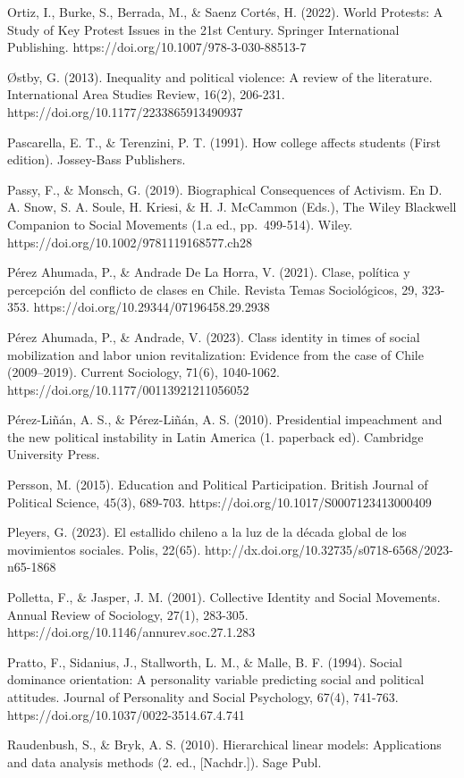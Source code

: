 \documentclass[
  13pt,
]{article}
\begin{document}
Ortiz, I., Burke, S., Berrada, M., \& Saenz Cortés, H. (2022). World
Protests: A Study of Key Protest Issues in the 21st Century. Springer
International Publishing. https://doi.org/10.1007/978-3-030-88513-7

Østby, G. (2013). Inequality and political violence: A review of the
literature. International Area Studies Review, 16(2), 206-231.
https://doi.org/10.1177/2233865913490937

Pascarella, E. T., \& Terenzini, P. T. (1991). How college affects
students (First edition). Jossey-Bass Publishers.

Passy, F., \& Monsch, G. (2019). Biographical Consequences of Activism.
En D. A. Snow, S. A. Soule, H. Kriesi, \& H. J. McCammon (Eds.), The
Wiley Blackwell Companion to Social Movements (1.a ed., pp.~499-514).
Wiley. https://doi.org/10.1002/9781119168577.ch28

Pérez Ahumada, P., \& Andrade De La Horra, V. (2021). Clase, política y
percepción del conflicto de clases en Chile. Revista Temas Sociológicos,
29, 323-353. https://doi.org/10.29344/07196458.29.2938

Pérez Ahumada, P., \& Andrade, V. (2023). Class identity in times of
social mobilization and labor union revitalization: Evidence from the
case of Chile (2009--2019). Current Sociology, 71(6), 1040-1062.
https://doi.org/10.1177/00113921211056052

Pérez-Liñán, A. S., \& Pérez-Liñán, A. S. (2010). Presidential
impeachment and the new political instability in Latin America (1.
paperback ed). Cambridge University Press.

Persson, M. (2015). Education and Political Participation. British
Journal of Political Science, 45(3), 689-703.
https://doi.org/10.1017/S0007123413000409

Pleyers, G. (2023). El estallido chileno a la luz de la década global de
los movimientos sociales. Polis, 22(65).
http://dx.doi.org/10.32735/s0718-6568/2023-n65-1868

Polletta, F., \& Jasper, J. M. (2001). Collective Identity and Social
Movements. Annual Review of Sociology, 27(1), 283-305.
https://doi.org/10.1146/annurev.soc.27.1.283

Pratto, F., Sidanius, J., Stallworth, L. M., \& Malle, B. F. (1994).
Social dominance orientation: A personality variable predicting social
and political attitudes. Journal of Personality and Social Psychology,
67(4), 741-763. https://doi.org/10.1037/0022-3514.67.4.741

Raudenbush, S., \& Bryk, A. S. (2010). Hierarchical linear models:
Applications and data analysis methods (2. ed., {[}Nachdr.{]}). Sage
Publ.
\end{document}
